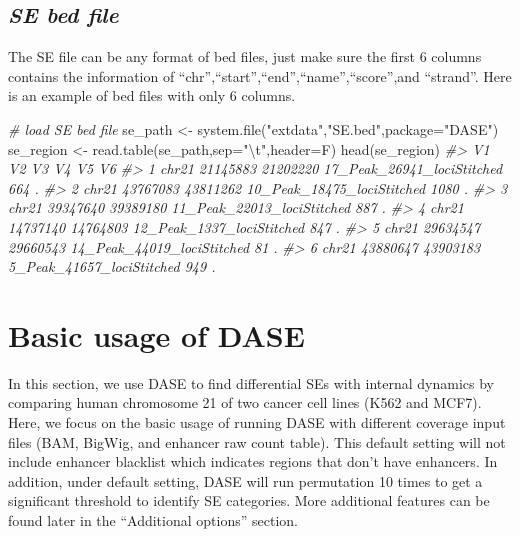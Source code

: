 \documentclass[
]{article}
\newenvironment{Shaded}{\begin{snugshade}}{\end{snugshade}}
\newcommand{\AttributeTok}[1]{\textcolor[rgb]{0.77,0.63,0.00}{#1}}
\newcommand{\CommentTok}[1]{\textcolor[rgb]{0.56,0.35,0.01}{\textit{#1}}}
\newcommand{\FunctionTok}[1]{\textcolor[rgb]{0.00,0.00,0.00}{#1}}
\newcommand{\NormalTok}[1]{#1}
\newcommand{\OtherTok}[1]{\textcolor[rgb]{0.56,0.35,0.01}{#1}}
\newcommand{\SpecialCharTok}[1]{\textcolor[rgb]{0.00,0.00,0.00}{#1}}
\newcommand{\StringTok}[1]{\textcolor[rgb]{0.31,0.60,0.02}{#1}}
\begin{document}
\hypertarget{se-bed-file}{%
\subsection{\texorpdfstring{\emph{SE bed
file}}{SE bed file}}\label{se-bed-file}}

The SE file can be any format of bed files, just make sure the first 6
columns contains the information of
``chr'',``start'',``end'',``name'',``score'',and ``strand''. Here is an
example of bed files with only 6 columns.

\begin{Shaded}
\begin{Highlighting}[]
\CommentTok{\# load SE bed file}
\NormalTok{se\_path }\OtherTok{\textless{}{-}} \FunctionTok{system.file}\NormalTok{(}\StringTok{"extdata"}\NormalTok{,}\StringTok{"SE.bed"}\NormalTok{,}\AttributeTok{package=}\StringTok{"DASE"}\NormalTok{)}
\NormalTok{se\_region }\OtherTok{\textless{}{-}} \FunctionTok{read.table}\NormalTok{(se\_path,}\AttributeTok{sep=}\StringTok{"}\SpecialCharTok{\textbackslash{}t}\StringTok{"}\NormalTok{,}\AttributeTok{header=}\NormalTok{F)}
\FunctionTok{head}\NormalTok{(se\_region)}
\CommentTok{\#\textgreater{}      V1       V2       V3                         V4   V5 V6}
\CommentTok{\#\textgreater{} 1 chr21 21145883 21202220 17\_Peak\_26941\_lociStitched  664  .}
\CommentTok{\#\textgreater{} 2 chr21 43767083 43811262 10\_Peak\_18475\_lociStitched 1080  .}
\CommentTok{\#\textgreater{} 3 chr21 39347640 39389180 11\_Peak\_22013\_lociStitched  887  .}
\CommentTok{\#\textgreater{} 4 chr21 14737140 14764803  12\_Peak\_1337\_lociStitched  847  .}
\CommentTok{\#\textgreater{} 5 chr21 29634547 29660543 14\_Peak\_44019\_lociStitched   81  .}
\CommentTok{\#\textgreater{} 6 chr21 43880647 43903183  5\_Peak\_41657\_lociStitched  949  .}
\end{Highlighting}
\end{Shaded}

\hypertarget{basic-usage-of-dase}{%
\section{Basic usage of DASE}\label{basic-usage-of-dase}}

In this section, we use DASE to find differential SEs with internal
dynamics by comparing human chromosome 21 of two cancer cell lines (K562
and MCF7). Here, we focus on the basic usage of running DASE with
different coverage input files (BAM, BigWig, and enhancer raw count
table). This default setting will not include enhancer blacklist which
indicates regions that don't have enhancers. In addition, under default
setting, DASE will run permutation 10 times to get a significant
threshold to identify SE categories. More additional features can be
found later in the ``Additional options'' section.
\end{document}
